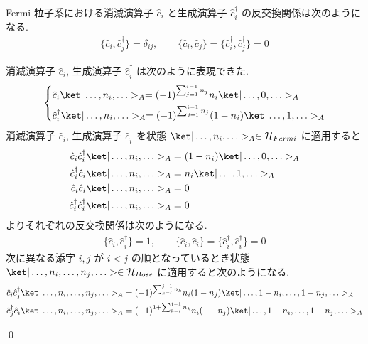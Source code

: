 \documentclass[uplatex,dvipdfmx,a4paper,11pt]{jlreq}
\makeatletter
\newcommand{\HH}{\mathcal{H}}
\numberwithin{equation}{section}
\theoremstyle{definition}
\renewenvironment{proof}[1][\proofname]{\par
  \normalfont
  \topsep6\p@\@plus6\p@ \trivlist
  \item[\hskip\labelsep{\bfseries #1}\@addpunct{\bfseries}]\ignorespaces\quad\par
}{
  \qed\endtrivlist\@endpefalse
}
\renewcommand\proofname{証明}
\makeatother
\begin{document}
\begin{theorem}
  Fermi 粒子系における消滅演算子 $\hat{c}_i$ と生成演算子 $\hat{c}_i^\dagger$ の反交換関係は次のようになる.
  \begin{align}
    \{\hat{c}_i, \hat{c}_j^\dagger\} = \delta_{ij}, \qquad \{\hat{c}_i, \hat{c}_j\} = \{\hat{c}_i^\dagger, \hat{c}_j^\dagger\} = 0
  \end{align}
\end{theorem}
\begin{proof}
  消滅演算子 $\hat{c}_i$, 生成演算子 $\hat{c}_i^\dagger$ は次のように表現できた.
  \begin{align}
    \begin{dcases}
      \hat{c}_i\ket|\ldots,n_i,\ldots>_A = (-1)^{\sum_{j=1}^{i-1}n_j}n_i\ket|\ldots,0,\ldots>_A \\
      \hat{c}_i^\dagger\ket|\ldots,n_i,\ldots>_A = (-1)^{\sum_{j=1}^{i-1}n_j}(1 - n_i)\ket|\ldots,1,\ldots>_A
    \end{dcases}
  \end{align}
  消滅演算子 $\hat{c}_i$, 生成演算子 $\hat{c}_i^\dagger$ を状態 $\ket|\ldots,n_i,\ldots>_A\in\HH_{Fermi}$ に適用すると
  \begin{align}
    \hat{c}_i\hat{c}_i^\dagger\ket|\ldots,n_i,\ldots>_A         & = (1 - n_i)\ket|\ldots,0,\ldots>_A \\
    \hat{c}_i^\dagger\hat{c}_i\ket|\ldots,n_i,\ldots>_A         & = n_i\ket|\ldots,1,\ldots>_A       \\
    \hat{c}_i\hat{c}_i\ket|\ldots,n_i,\ldots>_A                 & = 0                                \\
    \hat{c}_i^\dagger\hat{c}_i^\dagger\ket|\ldots,n_i,\ldots>_A & = 0
  \end{align}
  よりそれぞれの反交換関係は次のようになる.
  \begin{align}
    \{\hat{c}_i, \hat{c}_i^\dagger\} = 1, \qquad \{\hat{c}_i, \hat{c}_i\} = \{\hat{c}_i^\dagger, \hat{c}_i^\dagger\} = 0
  \end{align}
  次に異なる添字 $i, j$ が $i < j$ の順となっているとき状態 $\ket|\ldots,n_i,\ldots,n_j,\ldots>\in\HH_{Bose}$ に適用すると次のようになる.
  \begin{align}
    \hat{c}_i\hat{c}_j^\dagger\ket|\ldots,n_i,\ldots,n_j,\ldots>_A         & = (-1)^{\sum_{k=i}^{j-1}n_k}n_i(1 - n_j)\ket|\ldots,1-n_i,\ldots,1-n_j,\ldots>_A           \\
    \hat{c}_j^\dagger\hat{c}_i\ket|\ldots,n_i,\ldots,n_j,\ldots>_A         & = (-1)^{1 + \sum_{k=i}^{j-1}n_k}n_i(1 - n_j)\ket|\ldots,1-n_i,\ldots,1-n_j,\ldots>_A       \\

\end{align}
\end{proof}
\end{document}

